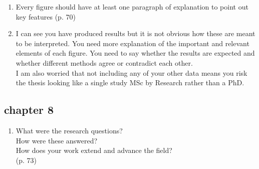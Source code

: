 \documentclass[10pt]{article}
\begin{document}
\begin{enumerate}[noitemsep,topsep=0pt]
\item Every figure should have at least one paragraph of explanation
	to point out key features (p. 70)

\item I can see you have produced results 
	but it is not obvious how these are meant to be interpreted.
	You need more explanation of the important and relevant elements
	of each figure.
	You need to say whether the results are expected and
	whether different methods agree or contradict each other. \\
	I am also worried that not including any of  your other data
	means you risk the thesis looking like a single study 
	MSc by Research rather than a PhD.


\end{enumerate}



\subsection{chapter 8}

\begin{enumerate}[noitemsep,topsep=0pt]

\item What were the research questions? \\
	How were these answered?\\
	How does your work extend and advance the field?\\
	(p. 73)

\end{enumerate}
\end{document}
